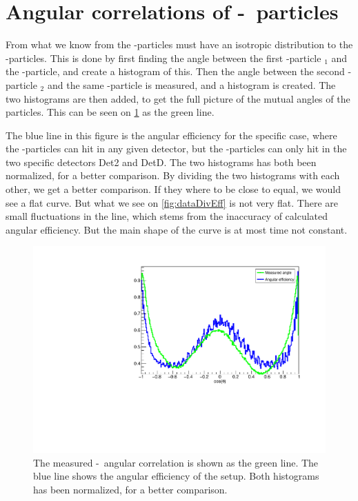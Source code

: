 \section{Angular correlations of \be-\al\ particles}
\label{sec:betaAngle}
From what we know from \cite{isotrop} the \be-particles must have an isotropic distribution to the \al-particles. 
This is done by first finding the angle between the first \al-particle \al$_1$ and the \be-particle, and create a histogram of this. Then the angle between the second \al-particle \al$_2$ and the same \be-particle is measured, and a histogram is created. The two histograms are then added, to get the full picture of the mutual angles of the particles. 
This can be seen on \cref{fig:effwithweight} as the green line.  

The blue line in this figure is the angular efficiency for the specific case, where the \al-particles can hit in any given detector, but the \be-particles can only hit in the two specific detectors Det2 and DetD. The two histograms has both been normalized, for a better comparison. By dividing the two histograms with each other, we get a better comparison. If they where to be close to equal, we would see a flat curve. But what we see on \cref{fig:dataDivEff} is not very flat. 
There are small fluctuations in the line, which stems from the inaccuracy of calculated angular efficiency. But the main shape of the curve is at most time not constant.

\begin{figure}[h]
	\centering
	\includegraphics[width=\linewidth]{../figures/betaAngles/betaAngle.pdf}
	\caption{The measured \be-\al\ angular correlation is shown as the green line. The blue line shows the angular efficiency of the setup. Both histograms has been normalized, for a better comparison.}
	\label{fig:effwithweight}
\end{figure}


